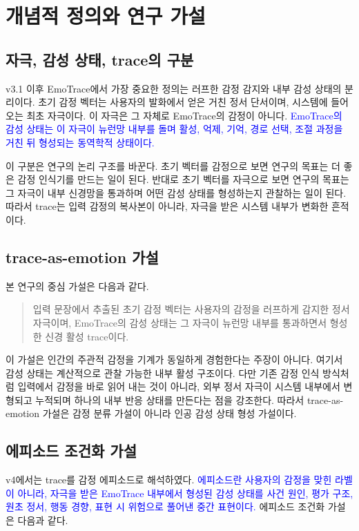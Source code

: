 ﻿\documentclass[11pt,a4paper]{article}
\begin{document}
\section{개념적 정의와 연구 가설}

\subsection{자극, 감성 상태, trace의 구분}

v3.1 이후 EmoTrace에서 가장 중요한 정의는 러프한 감정 감지와 내부 감성 상태의 분리이다. 초기 감정 벡터는 사용자의 발화에서 얻은 거친 정서 단서이며, 시스템에 들어오는 최초 자극이다. 이 자극은 그 자체로 EmoTrace의 감정이 아니다. \textcolor{blue}{EmoTrace의 감성 상태는 이 자극이 뉴런망 내부를 돌며 활성, 억제, 기억, 경로 선택, 조절 과정을 거친 뒤 형성되는 동역학적 상태이다.}

이 구분은 연구의 논리 구조를 바꾼다. 초기 벡터를 감정으로 보면 연구의 목표는 더 좋은 감정 인식기를 만드는 일이 된다. 반대로 초기 벡터를 자극으로 보면 연구의 목표는 그 자극이 내부 신경망을 통과하며 어떤 감성 상태를 형성하는지 관찰하는 일이 된다. 따라서 trace는 입력 감정의 복사본이 아니라, 자극을 받은 시스템 내부가 변화한 흔적이다.

\subsection{trace-as-emotion 가설}

본 연구의 중심 가설은 다음과 같다.

\begin{quote}
입력 문장에서 추출된 초기 감정 벡터는 사용자의 감정을 러프하게 감지한 정서 자극이며, EmoTrace의 감성 상태는 그 자극이 뉴런망 내부를 통과하면서 형성한 신경 활성 trace이다.
\end{quote}

이 가설은 인간의 주관적 감정을 기계가 동일하게 경험한다는 주장이 아니다. 여기서 감성 상태는 계산적으로 관찰 가능한 내부 활성 구조이다. 다만 기존 감정 인식 방식처럼 입력에서 감정을 바로 읽어 내는 것이 아니라, 외부 정서 자극이 시스템 내부에서 변형되고 누적되며 하나의 내부 반응 상태를 만든다는 점을 강조한다. 따라서 trace-as-emotion 가설은 감정 분류 가설이 아니라 인공 감성 상태 형성 가설이다.

\subsection{에피소드 조건화 가설}

v4에서는 trace를 감정 에피소드로 해석하였다. \textcolor{blue}{에피소드란 사용자의 감정을 맞힌 라벨이 아니라, 자극을 받은 EmoTrace 내부에서 형성된 감성 상태를 사건 원인, 평가 구조, 원초 정서, 행동 경향, 표현 시 위험으로 풀어낸 중간 표현이다.} 에피소드 조건화 가설은 다음과 같다.
\end{document}
